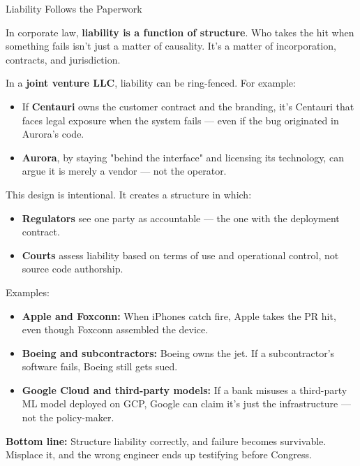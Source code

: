 \begin{TechnicalSidebar}{Liability Follows the Paperwork}

  In corporate law, \textbf{liability is a function of structure}.  
  Who takes the hit when something fails isn’t just a matter of causality. It’s a matter of incorporation, contracts, 
  and jurisdiction.
  
  \medskip
  
  In a \textbf{joint venture LLC}, liability can be ring-fenced. For example:

  \medskip

  \begin{itemize}
    \item If \textbf{Centauri} owns the customer contract and the branding, it's Centauri that faces legal exposure when the 
    system fails — even if the bug originated in Aurora's code.
    \item \textbf{Aurora}, by staying "behind the interface" and licensing its technology, can argue it is merely a vendor — 
    not the operator.
  \end{itemize}
  
  \medskip
  
  This design is intentional.  
  It creates a structure in which:

  \medskip

  \begin{itemize}
    \item \textbf{Regulators} see one party as accountable — the one with the deployment contract.
    \item \textbf{Courts} assess liability based on terms of use and operational control, not source code authorship.
  \end{itemize}
  
  \medskip
  
  Examples:

  \medskip

  \begin{itemize}
    \item \textbf{Apple and Foxconn:} When iPhones catch fire, Apple takes the PR hit, even though Foxconn assembled the device.
    \item \textbf{Boeing and subcontractors:} Boeing owns the jet. If a subcontractor’s software fails, Boeing still gets sued.
    \item \textbf{Google Cloud and third-party models:} If a bank misuses a third-party ML model deployed on GCP, Google can claim it's just the infrastructure — not the policy-maker.
  \end{itemize}
  
  \medskip
  
  \textbf{Bottom line:}  
  Structure liability correctly, and failure becomes survivable.  
  Misplace it, and the wrong engineer ends up testifying before Congress.
  
\end{TechnicalSidebar}

